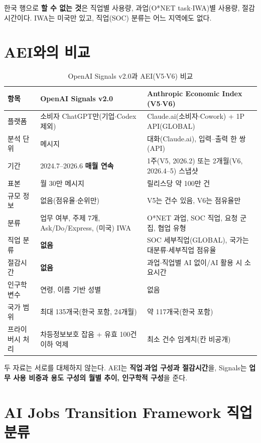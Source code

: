 \documentclass[11pt]{article}
\begin{document}
한국 행으로 \textbf{할 수 없는 것}은 직업별 사용량, 과업(O*NET task$\cdot$IWA)별 사용량, 절감시간이다. IWA는 미국만 있고, 직업(SOC) 분류는 어느 지역에도 없다.

\section{AEI와의 비교}

\begin{longtable}{L{2.8cm}L{5.9cm}L{5.9cm}}
\caption{OpenAI Signals v2.0과 AEI(V5$\cdot$V6) 비교}\label{tab:compare}\\
\toprule
항목 & OpenAI Signals v2.0 & Anthropic Economic Index (V5$\cdot$V6) \\
\midrule
\endhead
플랫폼 & 소비자 ChatGPT만(기업$\cdot$Codex 제외) & Claude.ai(소비자$\cdot$Cowork) + 1P API(GLOBAL) \\
분석 단위 & 메시지 & 대화(Claude.ai), 입력--출력 한 쌍(API) \\
기간 & 2024.7--2026.6 \textbf{매월 연속} & 1주(V5, 2026.2) 또는 2개월(V6, 2026.4--5) 스냅샷 \\
표본 & 월 30만 메시지 & 릴리스당 약 100만 건 \\
규모 정보 & 없음(점유율$\cdot$순위만) & V5는 건수 있음, V6는 점유율만 \\
분류 & 업무 여부, 주제 7개, Ask/Do/Express, (미국) IWA & O*NET 과업, SOC 직업, 요청 군집, 협업 유형 \\
직업 분류 & \textbf{없음} & SOC 세부직업(GLOBAL), 국가는 대분류$\cdot$세부직업 점유율 \\
절감시간 & \textbf{없음} & 과업$\cdot$직업별 AI 없이/AI 활용 시 소요시간 \\
인구학 변수 & 연령, 이름 기반 성별 & 없음 \\
국가 범위 & 최대 135개국(한국 포함, 24개월) & 약 117개국(한국 포함) \\
프라이버시 처리 & 차등정보보호 잡음 + 유효 100건 이하 억제 & 최소 건수 임계치(칸 비공개) \\
\bottomrule
\end{longtable}

두 자료는 서로를 대체하지 않는다. AEI는 \textbf{직업$\cdot$과업 구성과 절감시간}을, Signals는 \textbf{업무 사용 비중과 용도 구성의 월별 추이, 인구학적 구성}을 준다.

\section{AI Jobs Transition Framework 직업 분류}
\end{document}
